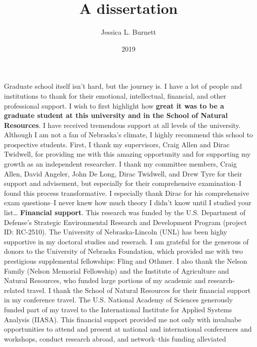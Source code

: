 \documentclass[12pt,twoside]{reedthesis}
\title{A dissertation}
\author{Jessica L. Burnett}
\date{2019}
\begin{document}
  \maketitle

\frontmatter %
\pagestyle{empty} %
  \begin{acknowledgements}
    Graduate school itself isn't hard, but the journey is. I have a lot of
    people and institutions to thank for their emotional, intellectual,
    financial, and other professional support. I wish to first highlight how
    \textbf{great it was to be a graduate student at this university and in
    the School of Natural Resources}. I have received tremendous support at
    all levels of the university. Although I am not a fan of Nebraska's
    climate, I highly recommend this school to prospective students. First,
    I thank my supervisors, Craig Allen and Dirac Twidwell, for providing me
    with this amazing opportunity and for supporting my growth as an
    independent researcher. I thank my committee members, Craig Allen, David
    Angeler, John De Long, Dirac Twidwell, and Drew Tyre for their support
    and advisement, but especially for their comprehensive examination--I
    found this process transformative. I especially thank Dirac for his
    comprehensive exam questions--I never knew how much theory I didn't know
    until I studied your list\ldots{} \textbf{Financial support}. This
    research was funded by the U.S. Department of Defense's Strategic
    Environmental Research and Development Program (project ID: RC-2510).
    The University of Nebraska-Lincoln (UNL) has been highy supportive in my
    doctoral studies and reserach. I am grateful for the generous of donors
    to the University of Nebraska Foundation, which provided me with two
    prestigious supplemental fellowships: Fling and Othmer. I also thank the
    Nelson Family (Nelson Memorial Fellowship) and the Institute of
    Agriculture and Natural Resources, who funded large portions of my
    academic and research-related travel. I thank the School of Natural
    Resources for their financial support in my conference travel. The U.S.
    National Academy of Sciences generously funded part of my travel to the
    International Institute for Applied Systems Analysis (IIASA). This
    financial support provided me not only with invaluabe opportunities to
    attend and present at national and international conferences and
    workshops, conduct research abroad, and network--this funding alleviated

\end{acknowledgements}
\end{document}
